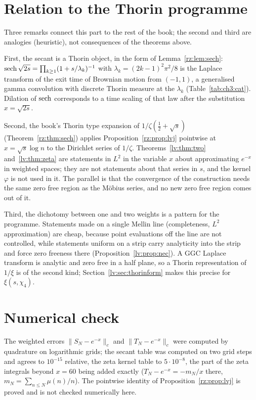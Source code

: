 \section{Relation to the Thorin programme}\label{lv:sec:thorin}

Three remarks connect this part to the rest of the book; the second and third are analogies (heuristic), not consequences of the theorems above.

First, the secant is a Thorin object, in the form of Lemma~\ref{rz:lem:sech}: $\operatorname{sech}\sqrt{2s}=\prod_{k\ge1}(1+s/\lambda_k)^{-1}$ with $\lambda_k=(2k-1)^2\pi^2/8$ is the Laplace transform of the exit time of Brownian motion from $(-1,1)$, a generalised gamma convolution with discrete Thorin measure at the $\lambda_k$ (Table~\ref{tab:ch3:cat}). Dilation of $\operatorname{sech}$ corresponds to a time scaling of that law after the substitution $x=\sqrt{2s}$.

Second, the book's Thorin type expansion of $1/\zeta(\frac12+\sqrt s)$ (Theorem~\ref{rz:thm:sech}) applies Proposition~\ref{rz:prop:lvj} pointwise at $x=\sqrt s\log n$ to the Dirichlet series of $1/\zeta$. Theorems~\ref{lv:thm:two} and~\ref{lv:thm:zeta} are statements in $L^2$ in the variable $x$ about approximating $e^{-x}$ in weighted spaces; they are not statements about that series in $s$, and the kernel $\varphi$ is not used in it. The parallel is that the convergence of the construction needs the same zero free region as the M\"obius series, and no new zero free region comes out of it.

Third, the dichotomy between one and two weights is a pattern for the programme. Statements made on a single Mellin line (completeness, $L^2$ approximation) are cheap, because point evaluations off the line are not controlled, while statements uniform on a strip carry analyticity into the strip and force zero freeness there (Proposition~\ref{lv:prop:nec}). A GGC Laplace transform is analytic and zero free in a half plane, so a Thorin representation of $1/\xi$ is of the second kind; Section~\ref{lv:sec:thorinform} makes this precise for $\xi(s,\chi_4)$.

\section{Numerical check}\label{lv:sec:numcheck}

The weighted errors $\|S_N-e^{-x}\|_c$ and $\|T_N-e^{-x}\|_c$ were computed by quadrature on logarithmic grids; the secant table was computed on two grid steps and agrees to $10^{-15}$ relative, the zeta kernel table to $5\cdot10^{-8}$, the part of the zeta integrals beyond $x=60$ being added exactly ($T_N-e^{-x}=-m_N/x$ there, $m_N=\sum_{n\le N}\mu(n)/n$). The pointwise identity of Proposition~\ref{rz:prop:lvj} is proved and is not checked numerically here.

